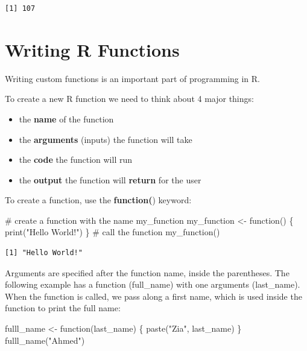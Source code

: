 \documentclass[
  letterpaper,
  DIV=11,
  numbers=noendperiod]{scrreprt}
\newenvironment{Shaded}{\begin{snugshade}}{\end{snugshade}}
\newcommand{\CommentTok}[1]{\textcolor[rgb]{0.37,0.37,0.37}{#1}}
\newcommand{\ControlFlowTok}[1]{\textcolor[rgb]{0.00,0.23,0.31}{#1}}
\newcommand{\FunctionTok}[1]{\textcolor[rgb]{0.28,0.35,0.67}{#1}}
\newcommand{\NormalTok}[1]{\textcolor[rgb]{0.00,0.23,0.31}{#1}}
\newcommand{\OtherTok}[1]{\textcolor[rgb]{0.00,0.23,0.31}{#1}}
\newcommand{\StringTok}[1]{\textcolor[rgb]{0.13,0.47,0.30}{#1}}
\begin{document}
\begin{verbatim}
[1] 107
\end{verbatim}

\hypertarget{writing-r-functions}{%
\section{Writing R Functions}\label{writing-r-functions}}

Writing custom functions is an important part of programming in R.

To create a new R function we need to think about 4 major things:

\begin{itemize}
\item
  the \textbf{name} of the function
\item
  the \textbf{arguments} (inputs) the function will take
\item
  the \textbf{code} the function will run
\item
  the \textbf{output} the function will \textbf{return} for the user
\end{itemize}

To create a function, use the \textbf{function(}) keyword:

\begin{Shaded}
\begin{Highlighting}[]
\CommentTok{\# create a function with the name my\_function}
\NormalTok{my\_function }\OtherTok{\textless{}{-}} \ControlFlowTok{function}\NormalTok{() \{ }
  \FunctionTok{print}\NormalTok{(}\StringTok{"Hello World!"}\NormalTok{)}
\NormalTok{\}}
\CommentTok{\# call the function}
\FunctionTok{my\_function}\NormalTok{()}
\end{Highlighting}
\end{Shaded}

\begin{verbatim}
[1] "Hello World!"
\end{verbatim}

Arguments are specified after the function name, inside the parentheses.
The following example has a function (full\_name) with one arguments
(last\_name). When the function is called, we pass along a first name,
which is used inside the function to print the full name:

\begin{Shaded}
\begin{Highlighting}[]
\NormalTok{fulll\_name }\OtherTok{\textless{}{-}} \ControlFlowTok{function}\NormalTok{(last\_name) \{}
  \FunctionTok{paste}\NormalTok{(}\StringTok{"Zia"}\NormalTok{,  last\_name)}
\NormalTok{\}}
\FunctionTok{fulll\_name}\NormalTok{(}\StringTok{"Ahmed"}\NormalTok{)}
\end{Highlighting}
\end{Shaded}
\end{document}
